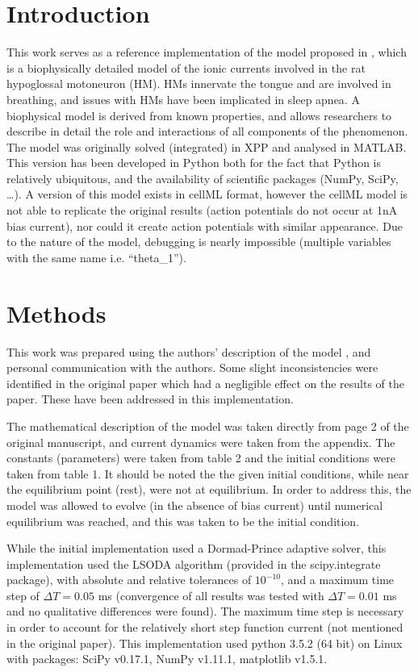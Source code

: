 \documentclass[10pt,a4paper,onecolumn]{article}
\begin{document}
\section{Introduction}\label{introduction}

This work serves as a reference implementation of the model proposed in
\autocite{purvis}, which is a biophysically detailed model of the ionic
currents involved in the rat hypoglossal motoneuron (HM). HMs innervate
the tongue and are involved in breathing, and issues with HMs have been
implicated in sleep apnea\autocite{purvis}. A biophysical model is
derived from known properties, and allows researchers to describe in
detail the role and interactions of all components of the phenomenon.
The model was originally solved (integrated) in XPP and analysed in
MATLAB. This version has been developed in Python both for the fact that
Python is relatively ubiquitous, and the availability of scientific
packages (NumPy, SciPy, \dots). A version of this model exists in cellML
format\autocite{cellml}, however the cellML model is not able to
replicate the original results (action potentials do not occur at 1nA
bias current), nor could it create action potentials with similar
appearance. Due to the nature of the model, debugging is nearly
impossible (multiple variables with the same name i.e. ``theta\_1'').

\section{Methods}\label{methods}

This work was prepared using the authors' description of the model
\autocite{purvis}, and personal communication with the authors. Some
slight inconsistencies were identified in the original paper which had a
negligible effect on the results of the paper. These have been addressed
in this implementation.

The mathematical description of the model was taken directly from page 2
of the original manuscript, and current dynamics were taken from the
appendix. The constants (parameters) were taken from table 2 and the
initial conditions were taken from table 1. It should be noted the the
given initial conditions, while near the equilibrium point (rest), were
not at equilibrium. In order to address this, the model was allowed to
evolve (in the absence of bias current) until numerical equilibrium was
reached, and this was taken to be the initial condition.

While the initial implementation used a Dormad-Prince adaptive solver,
this implementation used the LSODA algorithm (provided in the
scipy.integrate package), with absolute and relative tolerances of
\(10^{-10}\), and a maximum time step of \(\Delta T=0.05\) ms
(convergence of all results was tested with \(\Delta T=0.01\) ms and no
qualitative differences were found). The maximum time step is necessary
in order to account for the relatively short step function current (not
mentioned in the original paper). This implementation used python 3.5.2
(64 bit) on Linux with packages: SciPy v0.17.1, NumPy v1.11.1,
matplotlib v1.5.1.
\end{document}
